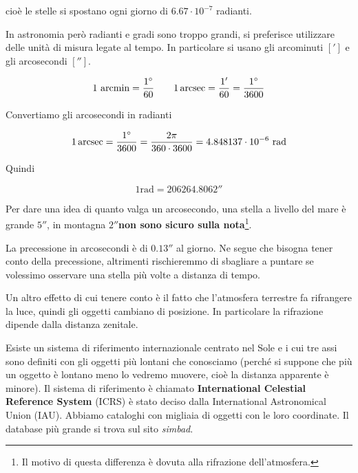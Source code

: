 cioè le stelle si spostano ogni giorno di $6.67\cdot 10^{-7}$ radianti.

In astronomia però radianti e gradi sono troppo grandi, si preferisce utilizzare delle unità di misura legate al tempo. In particolare si usano gli arcominuti $[']$ e gli arcosecondi $['']$.

$$1\text{ arcmin}=\frac{1^\circ}{60}\qquad 1 \arcsec =\frac{1'}{60}=\frac{1^\circ}{3600}$$

Convertiamo gli arcosecondi in radianti

$$1 \arcsec =\frac{1^\circ}{3600}=\frac{2\pi}{360\cdot3600}=4.848137\cdot 10^{-6}\ \text{rad}$$

Quindi

$$1\text{rad}=206264.8062''$$

Per dare una idea di quanto valga un arcosecondo, una stella a livello del mare è grande $5''$, in montagna $2''$\textbf{non sono sicuro sulla nota}\footnote{Il motivo di questa differenza è dovuta alla rifrazione dell'atmosfera.}.

La precessione in arcosecondi è di $0.13''$ al giorno. Ne segue che bisogna tener conto della precessione, altrimenti rischieremmo di sbagliare a puntare se volessimo osservare una stella più volte a distanza di tempo.

Un altro effetto di cui tenere conto è il fatto che l'atmosfera terrestre fa rifrangere la luce, quindi gli oggetti cambiano di posizione. In particolare la rifrazione dipende dalla distanza zenitale.

Esiste un sistema di riferimento internazionale centrato nel Sole e i cui tre assi sono definiti con gli oggetti più lontani che conosciamo (perché si suppone che più un oggetto è lontano meno lo vedremo muovere, cioè la distanza apparente è minore). Il sistema di riferimento è chiamato \textbf{International Celestial Reference System} (ICRS) è stato deciso dalla International Astronomical Union (IAU). Abbiamo cataloghi con migliaia di oggetti con le loro coordinate. Il database più grande si trova sul sito \textit{simbad}.